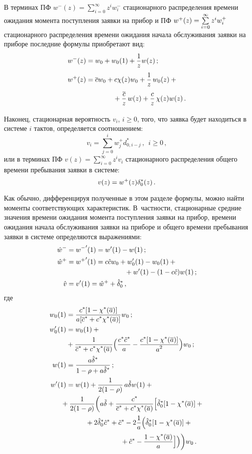 \begin{multicols}{2}
В терминах ПФ
$w^-(z) = \sum\limits_{i=0}^{\infty} z^i w^-_i$
стационарного распределения времени ожидания момента
поступления заявки на прибор и ПФ
$w^+(z) \hm= \sum\limits_{i=0}^{\infty} z^i w^+_i$
стационарного распределения времени ожидания начала
обслуживания заявки на приборе последние формулы
приобретают вид:
\begin{align}
w^-(z)&= w_0 + w_{0}(1) + \fr{1}{z} w(z)\,;\notag\\
\label{time+}
w^+(z) &= \oc w_0 + c \chi(z) w_0 + \fr{1}{z}\, w_0(z) + {}\\
&\hspace*{14mm}{}+\fr{\oc }{z}\, w(z) + \fr{c}{z}\,\chi(z) w(z)\,.
\end{align}

Наконец, стационарная вероятность $v_i$, $i\ge0$,
того, что заявка будет находиться в системе $i$ тактов,
определяется соотношением:
$$
v_i = \sum_{j=0}^{i} w^+_j d^{*}_{0,i-j}\,,
\ \ i\ge0\,,
$$
или в терминах ПФ
$v(z) = \sum\limits_{i=0}^{\infty} z^i v_i$
стационарного распределения общего
времени пребывания заявки в системе:
\begin{equation}
\label{full}
v(z)= w^+(z) \delta^{*}_0(z)\,.
\end{equation}

Как обычно, дифференцируя полученные в этом разделе формулы,
можно найти моменты соответствующих характеристик.
В~частности, стационарные средние значения времени ожидания
момента поступления заявки на прибор, времени ожидания
начала обслуживания заявки на приборе и общего времени
пребывания заявки в системе определяются выражениями:
\begin{align*}
\hat w^- &= {w^-}'(1) = w'(1) - w(1) \,;\\
\hat w^+&= {w^+}'(1) = c \hc w_0 + w'_0(1) - w_0(1) +{}\\
&\hspace*{30mm}{}+ w'(1) - (1 - c \hc) w(1) \,;
\\
\hat v &= v'(1) = \hat w^+ + \hd^*_0 \,,
\end{align*}
где
\begin{align*}
w_{0}(1) &= \fr{c^* [1 - \chi^*(\a)] }{a [\oc^* + c^* \chi^*(\a)]}w_0\,;
\\
w'_{0}(1) &= w_{0}(1) +{}\\
&{}+ \fr{1}{\oc^* + c^* \chi^*(\a)} \Big(
\fr{c^* {\hc^*} }{a} - \fr{c^* [1 - \chi^*(\a)] }{a^2} \Big) w_0\,;
\\
w(1) &= \fr{a \hd^* }{1 - \rho + a \hd^*}\,;
\\
w'(1) &= w(1) + \fr{1}{2 (1 - \rho)}\, a \td w(1) + {}\\
&\hspace*{-7.73407pt}{}+ \fr{1}{2 (1 - \rho)} \bigg(
a \td + \fr{c^* }{\oc^* + c^* \chi^*(\a)}
\Big[\td^{*}_0 [1 - \chi^*(\a)]
+{}\\
&\hspace*{10mm}{}+2 \hd^{*}_0 \hc^* +\tc^* - 2\fr{1}{a} \Big( \hd^{*}_0 [1 - \chi^*(\a)]
+ {}\\
&\hspace{28mm}{}+\hc^* - \fr{1 - \chi^*(\a) }{a } \Big] \Big) \bigg) w_0\,.
\end{align*}


\end{multicols}
